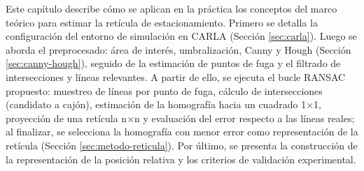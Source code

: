 \noindent
Este capítulo describe cómo se aplican en la práctica los conceptos del marco teórico 
para estimar la retícula de estacionamiento. Primero se detalla la configuración del 
entorno de simulación en CARLA (Sección \ref{sec:carla}). 
Luego se aborda el preprocesado: área de interés, umbralización, 
Canny y Hough (Sección \ref{sec:canny-hough}), seguido de la estimación de puntos de fuga 
y el filtrado de intersecciones y líneas relevantes. A partir de ello, 
se ejecuta el bucle RANSAC propuesto: muestreo de líneas por punto de fuga, cálculo de intersecciones 
(candidato a cajón), estimación de la homografía hacia un cuadrado 1×1, proyección de una retícula n×n 
y evaluación del error respecto a las líneas reales; al finalizar, se selecciona la homografía con menor 
error como representación de la retícula (Sección \ref{sec:metodo-reticula}). Por último, se presenta la 
construcción de la representación de la posición relativa y los criterios de validación experimental.